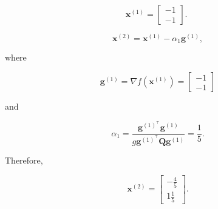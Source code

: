 \[
	\boldsymbol{x}^{(1)}=\left[\begin{array}{l}
		-1 \\
		-1
	\end{array}\right] \text {. }
\]

\[
	\boldsymbol{x}^{(2)}=\boldsymbol{x}^{(1)}-\alpha_{1} \boldsymbol{g}^{(1)},
\]

where

\[
	\boldsymbol{g}^{(1)}=\nabla f\left(\boldsymbol{x}^{(1)}\right)=\left[\begin{array}{l}
		-1 \\
		-1
	\end{array}\right]
\]

and

\[
	\alpha_{1}=\frac{\boldsymbol{g}^{(1)^{\top}} \boldsymbol{g}^{(1)}}{g\boldsymbol{g}^{(1)^{\top}} \boldsymbol{Q} \boldsymbol{g}^{(1)}}=\frac{1}{5}.
\]

Therefore,

\[
	\boldsymbol{x}^{(2)}=\left[\begin{array}{c}
		-\frac{4}{5} \\
		1 \frac{1}{5}
	\end{array}\right] .
\]
